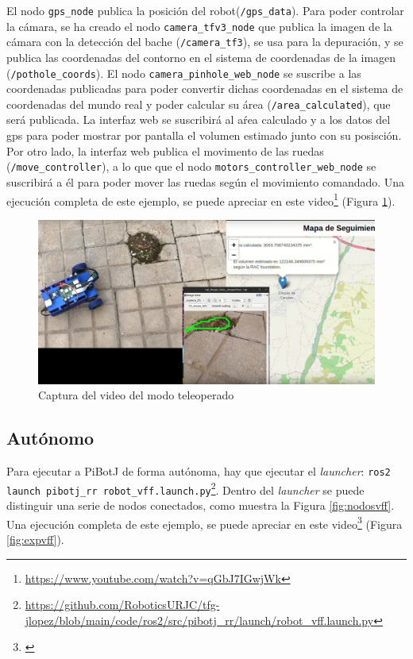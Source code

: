 El nodo \verb|gps_node| publica la posición del robot(\verb|/gps_data|). Para poder controlar la cámara, se ha creado el nodo \verb|camera_tfv3_node| que publica la imagen de la cámara con la detección del bache (\verb|/camera_tf3|), se usa para la depuración, y se publica las coordenadas del contorno en el sistema de coordenadas de la imagen (\verb|/pothole_coords|). El nodo \verb|camera_pinhole_web_node| se suscribe a las coordenadas publicadas para poder convertir dichas coordenadas en el sistema de coordenadas del mundo real y poder calcular su área (\verb|/area_calculated|), que será publicada. La interfaz web se suscribirá al aŕea calculado y a los datos del gps para poder mostrar por pantalla el volumen estimado junto con su posisción. Por otro lado, la interfaz web publica el movimento de las ruedas (\verb|/move_controller|), a lo que que el nodo \verb|motors_controller_web_node| se suscribirá a él para poder mover las ruedas según el movimiento comandado. Una ejecución completa de este ejemplo, se puede apreciar en este video\footnote{\url{https://www.youtube.com/watch?v=qGbJ7IGwjWk}} (Figura \ref{fig:expteleop}).


\begin{figure} [h!]
	\begin{center}
		\includegraphics[width=15cm]{figs/cap7/teleop_final.png}
	\end{center}
	\caption{Captura del video del modo teleoperado}
	\label{fig:expteleop}
\end{figure}


\subsection{Autónomo}

Para ejecutar a PiBotJ de forma autónoma, hay que ejecutar el \textit{launcher}: \verb|ros2 launch pibotj_rr robot_vff.launch.py|\footnote{\url{https://github.com/RoboticsURJC/tfg-jlopez/blob/main/code/ros2/src/pibotj_rr/launch/robot_vff.launch.py}}. Dentro del \textit{launcher} se puede distinguir una serie de nodos conectados, como muestra la Figura \ref{fig:nodosvff}. Una ejecución completa de este ejemplo, se puede apreciar en este video\footnote{\url{}} (Figura \ref{fig:expvff}). 

